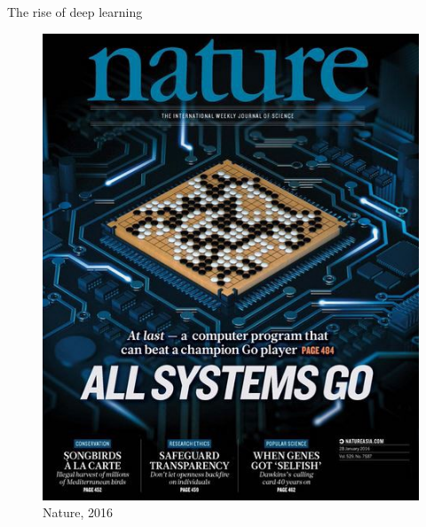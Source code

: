 \documentclass[xcolor=pdftex,dvipsnames,table,mathserif]{beamer}
\begin{document}
\begin{frame}{The rise of deep learning}

\begin{figure}[ht]
  \centering
  \includegraphics[height=0.5\textheight]{nature_go}
  \caption*{Nature, 2016}
\end{figure}


\end{frame}
\end{document}
